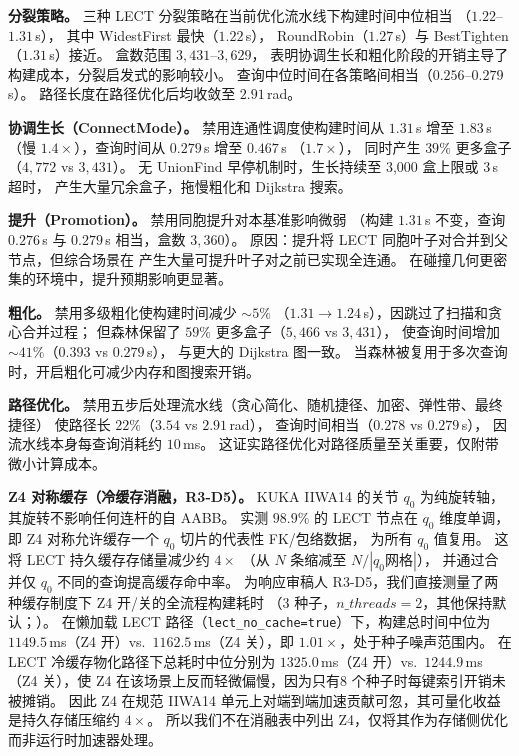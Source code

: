 \documentclass[journal]{IEEEtran}
\begin{document}
\begin{table}[ht]
\centering
\caption{消融实验（IIWA14，LinkIAABB 包络）。}
\label{tab:ablation}
\resizebox{\columnwidth}{!}{%

}
\end{table}

\textbf{分裂策略。}
三种 LECT 分裂策略在当前优化流水线下构建时间中位相当
（$1.22$--$1.31$\,s），
其中 WidestFirst 最快（$1.22$\,s），
RoundRobin（$1.27$\,s）与 BestTighten（$1.31$\,s）接近。
盒数范围 $3{,}431$--$3{,}629$，
表明协调生长和粗化阶段的开销主导了构建成本，分裂启发式的影响较小。
查询中位时间在各策略间相当（$0.256$--$0.279$\,s）。
路径长度在路径优化后均收敛至 $2.91$\,rad。

\textbf{协调生长（ConnectMode）。}
禁用连通性调度使构建时间从 $1.31$\,s 增至 $1.83$\,s
（慢 $1.4{\times}$），查询时间从 $0.279$\,s 增至 $0.467$\,s
（$1.7{\times}$），
同时产生 $39\%$ 更多盒子（$4{,}772$ vs $3{,}431$）。
无 UnionFind 早停机制时，生长持续至 3{,}000 盒上限或 3\,s 超时，
产生大量冗余盒子，拖慢粗化和 Dijkstra 搜索。

\textbf{提升（Promotion）。}
禁用同胞提升对本基准影响微弱
（构建 $1.31$\,s 不变，查询 $0.276$\,s 与 $0.279$\,s 相当，盒数 $3{,}360$）。
原因：提升将 LECT 同胞叶子对合并到父节点，但综合场景在
产生大量可提升叶子对之前已实现全连通。
在碰撞几何更密集的环境中，提升预期影响更显著。

\textbf{粗化。}
禁用多级粗化使构建时间减少 ${\sim}5\%$
（$1.31\to1.24$\,s），因跳过了扫描和贪心合并过程；
但森林保留了 $59\%$ 更多盒子（$5{,}466$ vs $3{,}431$），
使查询时间增加 ${\sim}41\%$（$0.393$ vs $0.279$\,s），
与更大的 Dijkstra 图一致。
当森林被复用于多次查询时，开启粗化可减少内存和图搜索开销。

\textbf{路径优化。}
禁用五步后处理流水线（贪心简化、随机捷径、加密、弹性带、最终捷径）
使路径长 $22\%$（$3.54$ vs $2.91$\,rad），
查询时间相当（$0.278$ vs $0.279$\,s），
因流水线本身每查询消耗约 $10$\,ms。
这证实路径优化对路径质量至关重要，仅附带微小计算成本。

\textbf{Z4 对称缓存（冷缓存消融，R3-D5）。}
KUKA IIWA14 的关节 $q_0$ 为纯旋转轴，其旋转不影响任何连杆的自 AABB。
实测 $98.9\%$ 的 LECT 节点在 $q_0$ 维度单调，
即 Z4 对称允许缓存一个 $q_0$ 切片的代表性 FK/包络数据，
为所有 $q_0$ 值复用。
这将 LECT 持久缓存存储量减少约 $4{\times}$
（从 $N$ 条缩减至 $N/|q_0\text{网格}|$），
并通过合并仅 $q_0$ 不同的查询提高缓存命中率。
为响应审稿人 R3-D5，我们直接测量了两种缓存制度下 Z4 开/关的全流程构建耗时
（3 种子，$n\_threads=2$，其他保持默认；）。
在懒加载 LECT 路径（\texttt{lect\_no\_cache=true}）下，构建总时间中位为
$1149.5$\,ms（Z4 开）vs.\ $1162.5$\,ms（Z4 关），即 $1.01\times$，处于种子噪声范围内。
在 LECT 冷缓存物化路径下总耗时中位分别为 $1325.0$\,ms（Z4 开）vs.\ $1244.9$\,ms
（Z4 关），使 Z4 在该场景上反而轻微偏慢，因为只有8 个种子时每键索引开销未被摊销。
因此 Z4 在规范 IIWA14 单元上对端到端加速贡献可忽，其可量化收益是持久存储压缩约 $4\times$。
所以我们不在消融表中列出 Z4，仅将其作为存储侧优化而非运行时加速器处理。
\end{document}
